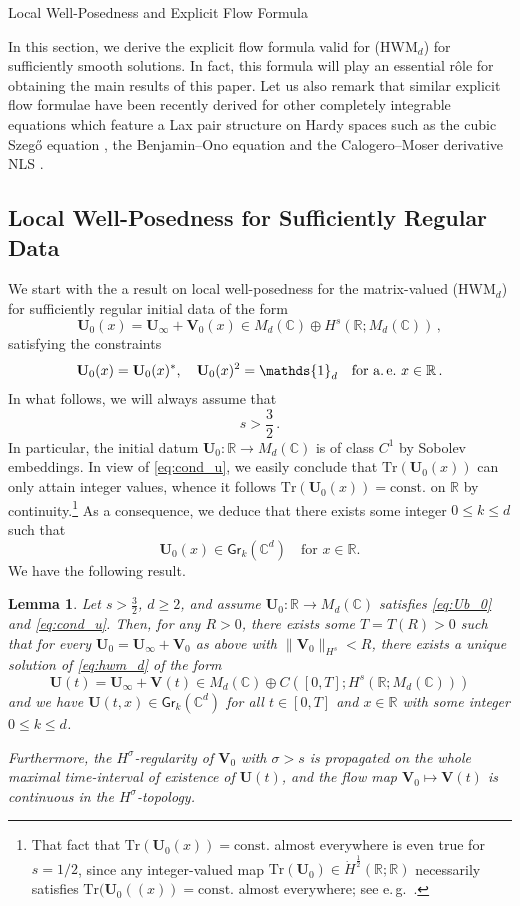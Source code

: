 \documentclass[11pt,reqno]{amsart}
\makeatletter
\newtheorem{lem}{Lemma}[section]
\theoremstyle{definition}
\theoremstyle{remark}
\theoremstyle{remark}
\numberwithin{equation}{section}
\newcommand{\C}{\mathbb{C}}
\newcommand{\R}{\mathbb{R}}
\newcommand{\be}{\begin{equation}}
\newcommand{\ee}{\end{equation}}
\newcommand{\Vb}{\mathbf{V}}
\newcommand{\Ub}{\mathbf{U}}
\newcommand{\Tr}{\mathrm{Tr}}
\newcommand{\Gr}{\mathsf{Gr}}
\def\section{\@startsection{section}{1}%
  \z@{1.5\linespacing\@plus\linespacing}{.5\linespacing}%
  {\normalfont\bfseries\large\centering}}
\makeatother
\begin{document}

\section{Local Well-Posedness and Explicit Flow Formula} 
\label{sec:gwp}

In this section, we derive the explicit flow formula valid for (HWM$_d$) for sufficiently smooth solutions. In fact, this formula will play an essential r\^ole for obtaining the main results of this paper. Let us also remark that similar explicit flow formulae have been recently derived for other completely integrable equations which feature a Lax pair structure on Hardy spaces such as the cubic Szeg\H{o} equation \cite{GeGr-15}, the Benjamin--Ono equation \cite{Ge-23} and the Calogero--Moser derivative NLS \cite{GeLe-24,Ba-24,KiLaVi-23}.


\subsection*{Local Well-Posedness for Sufficiently Regular Data}
We start with the a result on local well-posedness for the matrix-valued (HWM$_d$) for sufficiently regular initial data of the form
\be \label{eq:Ub_0}
\Ub_0(x) = \Ub_\infty + \Vb_0(x) \in M_d(\C) \oplus H^s(\R; M_d(\C))   \, ,
\ee
satisfying the constraints
\be \label{eq:cond_u}
\Ub_0(x) = \Ub_0(x)^*, \quad \Ub_0(x)^2 = \mathds{1}_d \quad \mbox{for a.\,e.~$x \in \R$} \, .
\ee
In what follows, we will always assume that 
$$
s > \frac{3}{2} \, .
$$
In particular, the initial datum $\Ub_0 : \R \to M_d(\C)$ is of class $C^1$ by Sobolev embeddings. In view of \eqref{eq:cond_u}, we easily conclude that $\Tr(\Ub_0(x))$ can only attain integer values, whence it follows $\Tr(\Ub_0(x)) = \mbox{const}.$ on $\R$ by continuity.\footnote{That fact that $\Tr(\Ub_0(x)) = \mbox{const}.$ almost everywhere is even true for $s=1/2$, since any integer-valued map $\Tr(\Ub_0) \in \dot{H}^{\frac{1}{2}}(\R;\R)$ necessarily satisfies $\Tr(\Ub_0((x) )= \mbox{const}.$ almost everywhere; see e.\,g.~\cite{Br-02}.} As a consequence, we deduce that there exists some integer $0 \leq k \leq d$ such that
$$
\Ub_0(x) \in \Gr_k(\C^d) \quad \mbox{for $x \in \R$}.
$$
We have the following result.

\begin{lem} \label{lem:lwp}
Let $s > \frac{3}{2}$, $d \geq 2$, and assume  $\Ub_0 : \R \to M_d(\C)$ satisfies \eqref{eq:Ub_0} and \eqref{eq:cond_u}. Then, for any $R> 0$, there exists some $T=T(R) >0$ such that for every $\Ub_0=\Ub_\infty + \Vb_0$ as above with $\| \Vb_0 \|_{H^s} < R$, there exists a unique solution of \eqref{eq:hwm_d} of the form
 $$
 \Ub(t) = \Ub_\infty + \Vb(t) \in  M_d(\C) \oplus C([0,T]; H^s(\R;M_d(\C)))
 $$
 and we have $\Ub(t,x) \in \Gr_k(\C^d)$ for all $t \in [0,T]$ and $x \in \R$ with some integer $0 \leq k \leq d$.
 
Furthermore, the $H^\sigma$-regularity of $\Vb_0$ with $\sigma > s$ is propagated on the whole maximal time-interval of existence of $\Ub(t)$, and the flow map $\Vb_0 \mapsto \Vb(t)$ is continuous in the $H^\sigma$-topology.
\end{lem}
\end{document}
